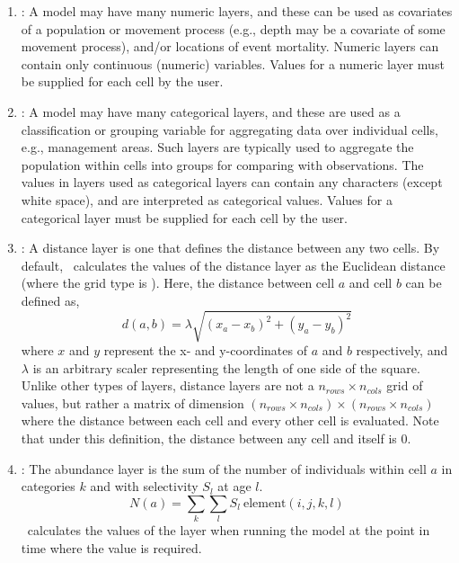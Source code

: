 \begin{enumerate}
\item{\label{numeric-layer}}: A model may have many numeric layers, and these can be used as covariates of a population or movement process (e.g., depth may be a covariate of some movement process), and/or locations of event mortality. Numeric layers can contain only continuous (numeric) variables. Values for a numeric layer must be supplied for each cell by the user.

\item {\label{categorical-layer}}: A model may have many categorical layers, and these are used as a classification or grouping variable for aggregating data over individual cells, e.g., management areas. Such layers are typically used to aggregate the population within cells into groups for comparing with observations. The values in layers used as categorical layers can contain any characters (except white space), and are interpreted as categorical values. Values for a categorical layer must be supplied for each cell by the user.

\item {}: A distance layer is one that defines the distance between any two cells. By default, \SPM\ calculates the values of the distance layer as the Euclidean distance (where the grid type is ). Here, the distance between cell $a$ and cell $b$ can be defined as,
\begin{equation}
  d(a,b) = \lambda \sqrt{(x_a - x_b)^2 + (y_a - y_b)^2}
\end{equation}
where $x$ and $y$ represent the x- and y-coordinates of $a$ and $b$ respectively, and $\lambda$ is an arbitrary scaler representing the length of one side of the square. Unlike other types of layers, distance layers are not a $n_{rows} \times n_{cols}$ grid of values, but rather a matrix of dimension $(n_{rows} \times n_{cols}) \times (n_{rows} \times n_{cols})$  where the distance between each cell and every other cell is evaluated. Note that under this definition, the distance between any cell and itself is 0. 

\item{}: The abundance layer is the sum of the number of individuals within cell $a$ in categories $k$ and with selectivity $S_l$ at age $l$. 
\begin{equation}
  N(a) = \sum\limits_{k} \sum\limits_l S_l \ \text{element}(i,j,k,l)
\end{equation}
\SPM\ calculates the values of the layer when running the model at the point in time where the value is required.


\end{enumerate}
